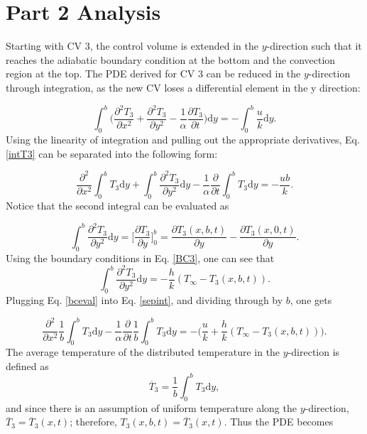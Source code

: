 \documentclass{article}
\newcommand{\dTTdt}{\frac{\partial T_3}{\partial t}}
\newcommand{\dTTdx}{\frac{\partial^2 T_3}{\partial x^2}}
\newcommand{\dTTdy}{\frac{\partial^2 T_3}{\partial y^2}}
\newcommand{\dy}{\text{d}y}
\begin{document}
\section{Part 2 Analysis}
Starting with CV 3, the control volume is extended in the $y$-direction such that it reaches the adiabatic boundary condition at the bottom and the convection region at the top. The PDE derived for CV 3 can be reduced in the $y$-direction through integration, as the new CV loses a differential element in the y direction:

\begin{equation}
    \int_0^b \bigg( \dTTdx + \dTTdy - \frac{1}{\alpha} \dTTdt \bigg) \text{d}y = -\int_0^b \frac{u}{k} \text{d} y.
    \label{intT3}
\end{equation}
Using the linearity of integration and pulling out the appropriate derivatives, Eq. \eqref{intT3} can be separated into the following form:

\begin{equation}
    \frac{\partial^2}{\partial x^2} \int_0^b T_3 \dy + \int_0^b \dTTdy \dy - \frac{1}{\alpha} \frac{\partial}{\partial t} \int_0^b T_3 \dy = -\frac{ub}{k}.
    \label{sepint}
\end{equation}
Notice that the second integral can be evaluated as

\begin{equation}
    \int_0^b \dTTdy \dy = \bigg[ \frac{\partial T_3}{\partial y} \bigg]_0^b = \frac{\partial T_3(x,b,t)}{\partial y} - \frac{\partial T_3(x,0,t)}{\partial y}.
\end{equation}
Using the boundary conditions in Eq. \eqref{BC3}, one can see that
\begin{equation}
    \int_0^b \dTTdy \dy = -\frac{h}{k}(T_\infty - T_3(x,b,t)).
    \label{bceval}
\end{equation}
Plugging Eq. \eqref{bceval} into Eq. \eqref{sepint}, and dividing through by $b$, one gets

\begin{equation}
    \frac{\partial^2}{\partial x^2} \frac{1}{b}\int_0^b T_3 \dy - \frac{1}{\alpha} \frac{\partial}{\partial t} \frac{1}{b}\int_0^b T_3 \dy = -\bigg(\frac{u}{k} + \frac{h}{k}(T_\infty - T_3(x,b,t))\bigg).
\end{equation}
The average temperature of the distributed temperature in the $y$-direction is defined as
\begin{equation}
    \overline{T}_3 = \frac{1}{b} \int_0^b T_3 \dy,
\end{equation}
and since there is an assumption of uniform temperature along the $y$-direction, $\overline{T}_3 = \overline{T}_3(x,t)$; therefore, $T_3(x,b,t)=\overline{T}_3(x,t)$. Thus the PDE becomes
\end{document}
